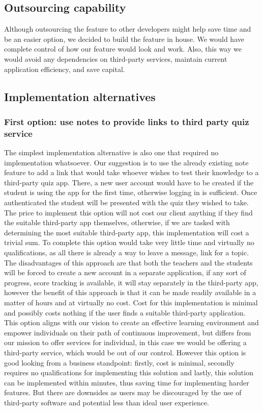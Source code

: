 \documentclass[
    english, %
]{VUMIFPSkursinis}
\begin{document}
\subsection{Outsourcing capability}

Although outsourcing the feature to other developers might help save time and be an easier option, we decided to build the feature in house. We would have complete control of how our feature would look and work. Also, this way we would avoid any dependencies on third-party services, maintain current application efficiency, and save capital.

\subsection{Implementation alternatives}

\subsubsection{First option: use notes to provide links to third party quiz service}

The simplest implementation alternative is also one that required no implementation whatsoever. Our suggestion is to use the already existing note feature to add a link that would take whoever wishes to test their knowledge to a third-party quiz app. There, a new user account would have to be created if the student is using the app for the first time, otherwise logging in is sufficient. Once authenticated the student will be presented with the quiz they wished to take. The price to implement this option will not cost our client anything if they find the suitable third-party app themselves, otherwise, if we are tasked with determining the most suitable third-party app, this implementation will cost a trivial sum. To complete this option would take very little time and virtually no qualifications, as all there is already a way to leave a message, link for a topic. The disadvantages of this approach are that both the teachers and the students will be forced to create a new account in a separate application, if any sort of progress, score tracking is available, it will stay separately in the third-party app, however the benefit of this approach is that it can be made readily available in a matter of hours and at virtually no cost. Cost for this implementation is minimal and possibly costs nothing if the user finds a suitable third-party application. This option aligns with our vision to create an effective learning environment and empower individuals on their path of continuous improvement, but differs from our mission to offer services for individual, in this case we would be offering a third-party service, which would be out of our control. However this option is good looking from a business standpoint: firstly, cost is minimal, secondly requires no qualifications for implementing this solution and lastly, this solution can be implemented within minutes, thus saving time for implementing harder features. But there are downsides as users may be discouraged by the use of third-party software and potential less than ideal user experience.
\end{document}
